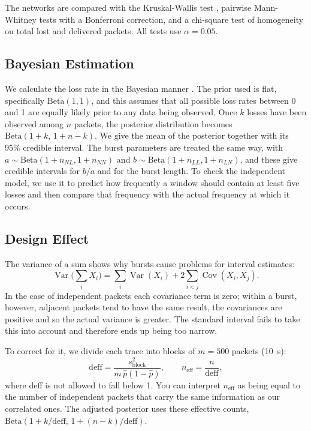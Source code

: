 \documentclass[conference]{IEEEtran}
\begin{document}
The networks are compared with the Kruskal-Wallis test \cite{kruskal1952}, pairwise Mann-Whitney tests \cite{mann1947} with a Bonferroni correction, and a chi-square test of homogeneity on total lost and delivered packets. All tests use $\alpha=0.05$.

\subsection{Bayesian Estimation}
We calculate the loss rate in the Bayesian manner \cite{gelman2013}. The prior used is flat, specifically $\text{Beta}(1,1)$, and this assumes that all possible loss rates between 0 and 1 are equally likely prior to any data being observed. Once $k$ losses have been observed among $n$ packets, the posterior distribution becomes $\text{Beta}(1+k,\,1+n-k)$. We give the mean of the posterior together with its 95\% credible interval. The burst parameters are treated the same way, with $a\sim\text{Beta}(1+n_{NL},1+n_{NN})$ and $b\sim\text{Beta}(1+n_{LL},1+n_{LN})$, and these give credible intervals for $b/a$ and for the burst length. To check the independent model, we use it to predict how frequently a window should contain at least five losses and then compare that frequency with the actual frequency at which it occurs.

\subsection{Design Effect}
The variance of a sum shows why bursts cause problems for interval estimates:
\begin{equation}
\operatorname{Var}\Big(\sum_i X_i\Big)=\sum_i\operatorname{Var}(X_i)+2\sum_{i<j}\operatorname{Cov}(X_i,X_j).
\end{equation}
In the case of independent packets each covariance term is zero; within a burst, however, adjacent packets tend to have the same result, the covariances are positive and so the actual variance is greater. The standard interval fails to take this into account and therefore ends up being too narrow.

To correct for it, we divide each trace into blocks of $m=500$ packets (10~s):
\begin{equation}
\text{deff}=\frac{s^2_{\text{block}}}{m\,\hat p(1-\hat p)},\qquad n_{\text{eff}}=\frac{n}{\text{deff}},
\end{equation}
where deff is not allowed to fall below 1. You can interpret $n_{\text{eff}}$ as being equal to the number of independent packets that carry the same information as our correlated ones. The adjusted posterior uses these effective counts, $\text{Beta}(1+k/\text{deff},\,1+(n-k)/\text{deff})$.
\end{document}
